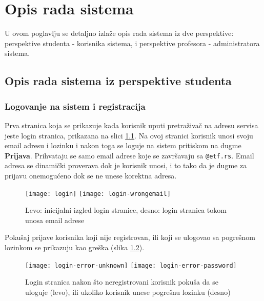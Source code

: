 \chapter{Opis rada sistema}\label{sistem}
U ovom poglavlju se detaljno izlaže opis rada sistema iz dve perspektive: perspektive studenta - korisnika sistema, i perspektive profesora - administratora sistema.

\section{Opis rada sistema iz perspektive studenta}
\subsection{Logovanje na sistem i registracija}
Prva stranica koja se prikazuje kada korisnik uputi pretraživač na adresu servisa jeste login stranica, prikazana na slici \ref{fig:login}. Na ovoj stranici korisnik unosi svoju email adresu i lozinku i nakon toga se loguje na sistem pritiskom na dugme \textbf{Prijava}. Prihvataju se samo email adrese koje se završavaju sa \texttt{@etf.rs}. Email adresa se dinamički proverava dok je korisnik unosi, i to tako da je dugme za prijavu onemogućeno dok se ne unese korektna adresa.
\begin{figure}[p]
\texttt{[image: login]}
\texttt{[image: login-wrongemail]}
\caption{Levo: inicijalni izgled login stranice, desno: login stranica tokom unosa email adrese}
\label{fig:login}
\end{figure}
Pokušaj prijave korisnika koji nije registrovan, ili koji se ulogovao sa pogrešnom lozinkom se prikazuju kao greška (slika \ref{fig:login-error}).
\begin{figure}[p]
\texttt{[image: login-error-unknown]}
\texttt{[image: login-error-password]}
\caption{Login stranica nakon što neregistrovani korisnik pokuša da se uloguje (levo), ili ukoliko korisnik unese pogrešnu lozinku (desno)}
\label{fig:login-error}
\end{figure}

